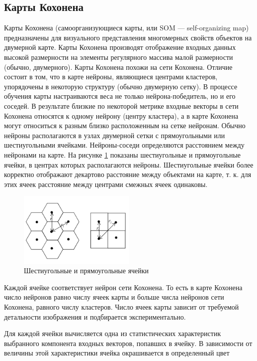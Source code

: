 \documentclass[bachelor, och, referat]{SCWorks}
\begin{document}
\subsection{Карты Кохонена}
Карты Кохонена (самоорганизующиеся карты, или SOM —
self-organizing map)  предназначены для визуального представления
многомерных свойств объектов на двумерной карте. Карты Кохонена
производят отображение входных данных высокой размерности на элементы
регулярного массива малой размерности (обычно, двумерного). Карты
Кохонена похожи на сети Кохонена. Отличие состоит в том, что в карте
нейроны, являющиеся центрами кластеров, упорядочены в некоторую
структуру (обычно двумерную сетку). В процессе обучения карты
настраиваются веса не только нейрона-победитель, но и его соседей. В
результате близкие по некоторой метрике входные векторы в сети Кохонена
относятся к одному нейрону (центру кластера), а в карте Кохонена могут
относиться к разным близко расположенным на сетке нейронам. Обычно
нейроны располагаются в узлах двумерной сетки с прямоугольными или
шестиугольными ячейками. Нейроны-соседи определяются расстоянием
между нейронами на карте. На рисунке \ref{map} показаны шестиугольные и
прямоугольные ячейки, в центрах которых располагаются нейроны.
Шестиугольные ячейки более корректно отображают декартово расстояние
между объектами на карте, т. к. для этих ячеек расстояние между центрами
смежных ячеек одинаковы. 

\begin{figure}[H]
    \centering
    \includegraphics[width=0.5\textwidth]{8.png}
    \caption{Шестиугольные и прямоугольные ячейки}
    \label{map}
\end{figure}

Каждой ячейке соответствует нейрон сети Кохонена. То есть в карте
Кохонена число нейронов равно числу ячеек карты и больше числа нейронов
сети Кохонена, равного числу кластеров. Число ячеек карты зависит от
требуемой детальности изображения и подбирается экспериментально. 

Для каждой ячейки вычисляется одна из статистических характеристик
выбранного компонента входных векторов, попавших в ячейку. В
зависимости от величины этой характеристики ячейка окрашивается в
определенный цвет
\end{document}
